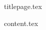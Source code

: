 \documentclass[letterpaper, 10pt]{article}
\begin{document}
{titlepage.tex}

{\centering\tableofcontents\par}
{\centering\listoffigures\par}
{\centering\listoftables\par}
\clearpage

{content.tex}
\end{document}
